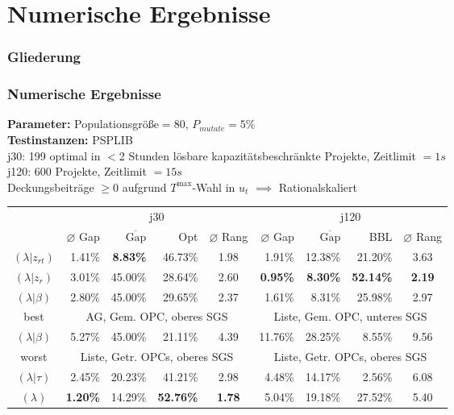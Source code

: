 
\section{Numerische Ergebnisse}
\begin{frame}
\frametitle{Gliederung}
\end{frame}


\begin{frame}[t]
\frametitle{Numerische Ergebnisse}
\begin{footnotesize}
\textbf{Parameter:} Populationsgröße$=80$, $P_{mutate}=5\%$\\
\textbf{Testinstanzen:} PSPLIB\\
j30: 199 optimal in $<$2 Stunden lösbare kapazitätsbeschränkte Projekte, Zeitlimit $=1s$\\
j120: 600 Projekte, Zeitlimit $=15s$\\[3mm]
Deckungsbeiträge $\geq 0$ aufgrund $T^{\mbox{max}}$-Wahl in $u_t$ $\implies$ Rationalskaliert

\begin{center}	
\tabcolsep=0.16cm
\begin{tabular}{|c|rrrc|rrrc|}
	\hline
	& \multicolumn{4}{c|}{j30} & \multicolumn{4}{c|}{j120}\\
	 & $\varnothing$ Gap & $\overline{\mbox{Gap}}$ & Opt & $\varnothing$ Rang & $\varnothing$ Gap & $\overline{\mbox{Gap}}$ & BBL & $\varnothing$ Rang \\[3pt]
	\hline
   $(\lambda|z_{rt})$&1.41\%&\textbf{8.83\%}&46.73\%&1.98&1.91\%&12.38\%&21.20\%&3.63\\
	\hline
   $(\lambda|z_r)$&3.01\%&45.00\%&28.64\%&2.60&\textbf{0.95\%}&\textbf{8.30\%}&\textbf{52.14\%}&\textbf{2.19}\\
	\hline
	$(\lambda|\beta)$&2.80\%&45.00\%&29.65\%&2.37&1.61\%&8.31\%&25.98\%&2.97\\
	best & \multicolumn{4}{c|}{AG, Gem. OPC, oberes SGS} & \multicolumn{4}{c|}{Liste, Gem. OPC, unteres SGS}\\
	\hline
	$(\lambda|\beta)$&5.27\%&45.00\%&21.11\%&4.39&11.76\%&28.25\%&8.55\%&9.56\\
	worst & \multicolumn{4}{c|}{Liste, Getr. OPCs, oberes SGS} & \multicolumn{4}{c|}{Liste, Getr. OPCs, oberes SGS}\\
	\hline
	$(\lambda|\tau)$&2.45\%&20.23\%&41.21\%&2.98&4.48\%&14.17\%&2.56\%&6.08\\
	\hline
	$(\lambda)$& \textbf{1.20\%}&14.29\%&\textbf{52.76\%}&\textbf{1.78}&5.04\%&19.18\%&27.52\%&5.40\\
	\hline
\end{tabular}
\end{center}

\end{footnotesize}	

\end{frame}

